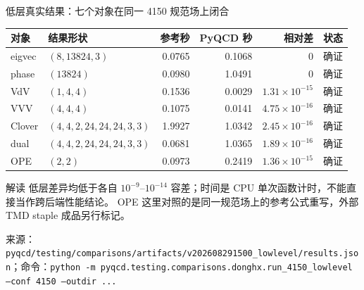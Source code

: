 \documentclass[UTF8,aspectratio=169,11pt]{ctexbeamer}
\newcommand{\source}[1]{\vspace{0.05em}\par{\raggedright\scriptsize\color{muted}来源：#1\par}}
\newcommand{\codepath}[1]{\nolinkurl{#1}}
\newcommand{\verified}{\textcolor{evidence}{确证}}
\begin{document}
\begin{frame}[t]{低层真实结果：七个对象在同一 4150 规范场上闭合}
  \footnotesize
  \setlength{\tabcolsep}{4pt}
  \renewcommand{\arraystretch}{1.10}
  \begin{tabularx}{0.96\textwidth}{@{}L Y r r r l@{}}
    \toprule
    对象 & 结果形状 & 参考秒 & PyQCD 秒 & 相对差 & 状态\\
    \midrule
    eigvec & $(8,13824,3)$ & 0.0765 & 0.1068 & $0$ & \verified\\
    phase & $(13824)$ & 0.0980 & 1.0491 & $0$ & \verified\\
    VdV & $(1,4,4)$ & 0.1536 & 0.0029 & $1.31\times10^{-15}$ & \verified\\
    VVV & $(4,4,4)$ & 0.1075 & 0.0141 & $4.75\times10^{-16}$ & \verified\\
    Clover & $(4,4,2,24,24,24,3,3)$ & 1.9927 & 1.0342 & $2.45\times10^{-16}$ & \verified\\
    dual & $(4,4,2,24,24,24,3,3)$ & 0.0681 & 1.0365 & $1.89\times10^{-16}$ & \verified\\
    OPE & $(2,2)$ & 0.0973 & 0.2419 & $1.36\times10^{-15}$ & \verified\\
    \bottomrule
  \end{tabularx}
  \vfill
  \begin{block}{解读}
    低层差异均低于各自 $10^{-9}$--$10^{-14}$ 容差；时间是 CPU 单次函数计时，不能直接当作跨后端性能结论。
    OPE 这里对照的是同一规范场上的参考公式重写，外部 TMD staple 成品另行标记。
  \end{block}
  \source{\codepath{pyqcd/testing/comparisons/artifacts/v202608291500_lowlevel/results.json}；命令：\texttt{python -m pyqcd.testing.comparisons.donghx.run\_4150\_lowlevel --conf 4150 --outdir ...}}
\end{frame}
\end{document}
